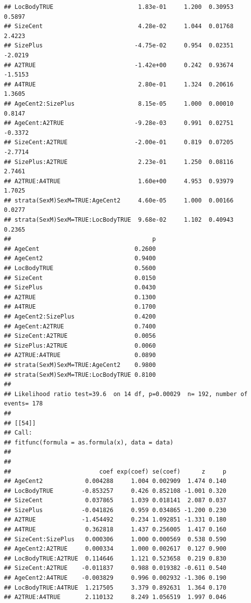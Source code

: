 \documentclass{article}\usepackage[]{graphicx}\usepackage[]{color}
\makeatletter
\newenvironment{kframe}{%
 \def\at@end@of@kframe{}%
 \ifinner\ifhmode%
  \def\at@end@of@kframe{\end{minipage}}%
  \begin{minipage}{\columnwidth}%
 \fi\fi%
 \def\FrameCommand##1{\hskip\@totalleftmargin \hskip-\fboxsep
 \colorbox{shadecolor}{##1}\hskip-\fboxsep
     \hskip-\linewidth \hskip-\@totalleftmargin \hskip\columnwidth}%
 \MakeFramed {\advance\hsize-\width
   \@totalleftmargin\z@ \linewidth\hsize
   \@setminipage}}%
 {\par\unskip\endMakeFramed%
 \at@end@of@kframe}
\newenvironment{knitrout}{}{} %
\makeatother
\begin{document}
\begin{knitrout}
\begin{kframe}
\begin{verbatim}
## LocBodyTRUE                        1.83e-01     1.200  0.30953  0.5897
## SizeCent                           4.28e-02     1.044  0.01768  2.4223
## SizePlus                          -4.75e-02     0.954  0.02351 -2.0219
## A2TRUE                            -1.42e+00     0.242  0.93674 -1.5153
## A4TRUE                             2.80e-01     1.324  0.20616  1.3605
## AgeCent2:SizePlus                  8.15e-05     1.000  0.00010  0.8147
## AgeCent:A2TRUE                    -9.28e-03     0.991  0.02751 -0.3372
## SizeCent:A2TRUE                   -2.00e-01     0.819  0.07205 -2.7714
## SizePlus:A2TRUE                    2.23e-01     1.250  0.08116  2.7461
## A2TRUE:A4TRUE                      1.60e+00     4.953  0.93979  1.7025
## strata(SexM)SexM=TRUE:AgeCent2     4.60e-05     1.000  0.00166  0.0277
## strata(SexM)SexM=TRUE:LocBodyTRUE  9.68e-02     1.102  0.40943  0.2365
##                                        p
## AgeCent                           0.2600
## AgeCent2                          0.9400
## LocBodyTRUE                       0.5600
## SizeCent                          0.0150
## SizePlus                          0.0430
## A2TRUE                            0.1300
## A4TRUE                            0.1700
## AgeCent2:SizePlus                 0.4200
## AgeCent:A2TRUE                    0.7400
## SizeCent:A2TRUE                   0.0056
## SizePlus:A2TRUE                   0.0060
## A2TRUE:A4TRUE                     0.0890
## strata(SexM)SexM=TRUE:AgeCent2    0.9800
## strata(SexM)SexM=TRUE:LocBodyTRUE 0.8100
## 
## Likelihood ratio test=39.6  on 14 df, p=0.00029  n= 192, number of events= 178 
## 
## [[54]]
## Call:
## fitfunc(formula = as.formula(x), data = data)
## 
## 
##                         coef exp(coef) se(coef)      z     p
## AgeCent2            0.004288     1.004 0.002909  1.474 0.140
## LocBodyTRUE        -0.853257     0.426 0.852108 -1.001 0.320
## SizeCent            0.037865     1.039 0.018141  2.087 0.037
## SizePlus           -0.041826     0.959 0.034865 -1.200 0.230
## A2TRUE             -1.454492     0.234 1.092851 -1.331 0.180
## A4TRUE              0.362818     1.437 0.256005  1.417 0.160
## SizeCent:SizePlus   0.000306     1.000 0.000569  0.538 0.590
## AgeCent2:A2TRUE     0.000334     1.000 0.002617  0.127 0.900
## LocBodyTRUE:A2TRUE  0.114646     1.121 0.523658  0.219 0.830
## SizeCent:A2TRUE    -0.011837     0.988 0.019382 -0.611 0.540
## AgeCent2:A4TRUE    -0.003829     0.996 0.002932 -1.306 0.190
## LocBodyTRUE:A4TRUE  1.217505     3.379 0.892631  1.364 0.170
## A2TRUE:A4TRUE       2.110132     8.249 1.056519  1.997 0.046

\end{verbatim}
\end{kframe}
\end{knitrout}
\end{document}
